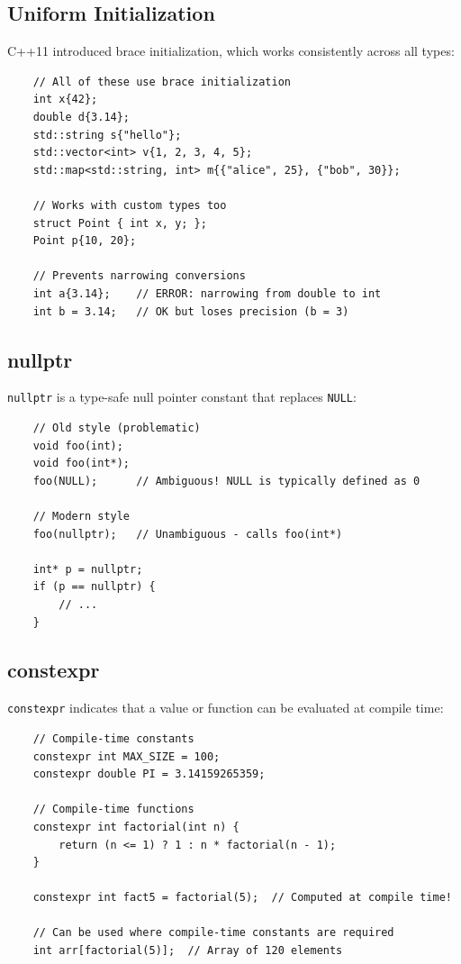 \subsection{Uniform Initialization}

C++11 introduced brace initialization, which works consistently across all types:

\begin{lstlisting}
	// All of these use brace initialization
	int x{42};
	double d{3.14};
	std::string s{"hello"};
	std::vector<int> v{1, 2, 3, 4, 5};
	std::map<std::string, int> m{{"alice", 25}, {"bob", 30}};
	
	// Works with custom types too
	struct Point { int x, y; };
	Point p{10, 20};
	
	// Prevents narrowing conversions
	int a{3.14};    // ERROR: narrowing from double to int
	int b = 3.14;   // OK but loses precision (b = 3)
\end{lstlisting}

\subsection{nullptr}

\texttt{nullptr} is a type-safe null pointer constant that replaces \texttt{NULL}:

\begin{lstlisting}
	// Old style (problematic)
	void foo(int);
	void foo(int*);
	foo(NULL);      // Ambiguous! NULL is typically defined as 0
	
	// Modern style
	foo(nullptr);   // Unambiguous - calls foo(int*)
	
	int* p = nullptr;
	if (p == nullptr) {
		// ...
	}
\end{lstlisting}

\subsection{constexpr}

\texttt{constexpr} indicates that a value or function can be evaluated at compile time:

\begin{lstlisting}
	// Compile-time constants
	constexpr int MAX_SIZE = 100;
	constexpr double PI = 3.14159265359;
	
	// Compile-time functions
	constexpr int factorial(int n) {
		return (n <= 1) ? 1 : n * factorial(n - 1);
	}
	
	constexpr int fact5 = factorial(5);  // Computed at compile time!
	
	// Can be used where compile-time constants are required
	int arr[factorial(5)];  // Array of 120 elements
\end{lstlisting}

